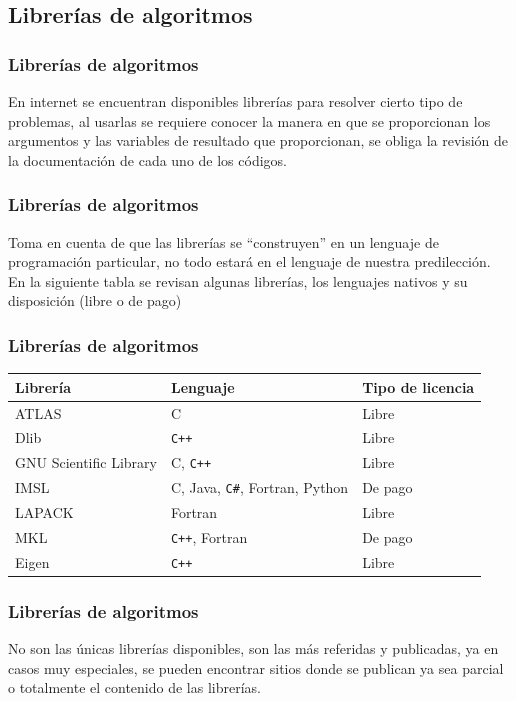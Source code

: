 \subsection{Librerías de algoritmos}
\begin{frame}
\frametitle{Librerías de algoritmos}
En internet se encuentran disponibles librerías para resolver cierto tipo de problemas, al usarlas se requiere conocer la manera en que se proporcionan los argumentos y las variables de resultado que proporcionan, se obliga la revisión de la documentación de cada uno de los códigos.
\end{frame}
\begin{frame}
\frametitle{Librerías de algoritmos}
Toma en cuenta de que las librerías se \enquote{construyen} en un lenguaje de programación particular, no todo estará en el lenguaje de nuestra predilección.
\\
\bigskip
En la siguiente tabla se revisan algunas librerías, los lenguajes nativos y su disposición (libre o de pago)
\end{frame}
\begin{frame}[fragile]
\frametitle{Librerías de algoritmos}
\fontsize{12}{12}\selectfont
\begin{table}
\begin{tabular}{ p{4cm} p{3cm} l}
Librería & Lenguaje & Tipo de licencia \\ \hline
ATLAS & C & Libre \\ \hline
Dlib & \verb|C++| & Libre \\ \hline
GNU Scientific Library & C, \verb|C++| & Libre \\ \hline
IMSL & C, Java, \verb|C#|, Fortran, Python & De pago \\ \hline
LAPACK & Fortran & Libre \\ \hline
MKL & \verb|C++|, Fortran & De pago \\ \hline
Eigen & \verb|C++| & Libre \\ \hline
\end{tabular}
\end{table}
\end{frame}
\begin{frame}
\frametitle{Librerías de algoritmos}
No son las únicas librerías disponibles, son las más referidas y publicadas, ya en casos muy especiales, se pueden encontrar sitios donde se publican ya sea parcial o totalmente el contenido de las librerías.
\end{frame}
